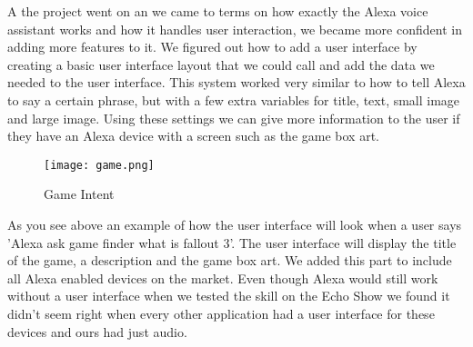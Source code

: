 A the project went on an we came to terms on how exactly the Alexa voice assistant works and how it handles user interaction, we became more confident in adding more features to it. We figured out how to add a user interface by creating a basic user interface layout that we could call and add the data we needed to the user interface. This system worked very similar to how to tell Alexa to say a certain phrase, but with a few extra variables for title, text, small image and large image. Using these settings we can give more information to the user if they have an Alexa device with a screen such as the game box art.

\begin{figure}[h!]
  \texttt{[image: game.png]}
  \caption{Game Intent}
  \label{fig:gameintent}
\end{figure}

As you see above an example of how the user interface will look when a user says 'Alexa ask game finder what is fallout 3'. The user interface will display the title of the game, a description and the game box art. We added this part to include all Alexa enabled devices on the market. Even though Alexa would still work without a user interface when we tested the skill on the Echo Show we found it didn't seem right when every other application had a user interface for these devices and ours had just audio.